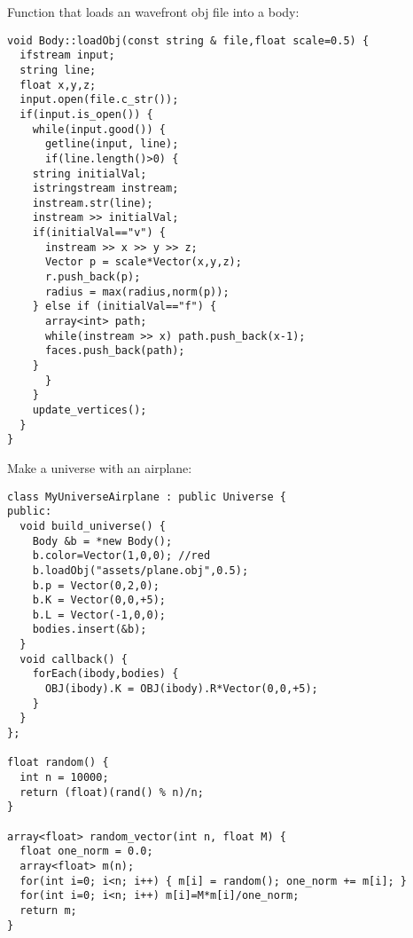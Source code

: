 \noindent
Function that loads an wavefront obj file into a body: \begin{lstlisting}
void Body::loadObj(const string & file,float scale=0.5) {
  ifstream input;
  string line;
  float x,y,z;
  input.open(file.c_str());
  if(input.is_open()) {
    while(input.good()) {
      getline(input, line);
      if(line.length()>0) {
	string initialVal;
	istringstream instream;
	instream.str(line);
	instream >> initialVal;
	if(initialVal=="v") {
	  instream >> x >> y >> z;
	  Vector p = scale*Vector(x,y,z);
	  r.push_back(p);
	  radius = max(radius,norm(p));
	} else if (initialVal=="f") {
	  array<int> path;
	  while(instream >> x) path.push_back(x-1);
	  faces.push_back(path);
	}
      }
    }
    update_vertices();
  }
}
\end{lstlisting}
\noindent
Make a universe with an airplane: \begin{lstlisting}
class MyUniverseAirplane : public Universe {
public:
  void build_universe() {
    Body &b = *new Body();
    b.color=Vector(1,0,0); //red
    b.loadObj("assets/plane.obj",0.5);
    b.p = Vector(0,2,0);
    b.K = Vector(0,0,+5);
    b.L = Vector(-1,0,0);
    bodies.insert(&b);
  }
  void callback() {
    forEach(ibody,bodies) {
      OBJ(ibody).K = OBJ(ibody).R*Vector(0,0,+5);
    }
  }
};

float random() {
  int n = 10000;
  return (float)(rand() % n)/n;
}

array<float> random_vector(int n, float M) {
  float one_norm = 0.0;
  array<float> m(n);
  for(int i=0; i<n; i++) { m[i] = random(); one_norm += m[i]; }
  for(int i=0; i<n; i++) m[i]=M*m[i]/one_norm;
  return m;
}
\end{lstlisting}
\noindent

